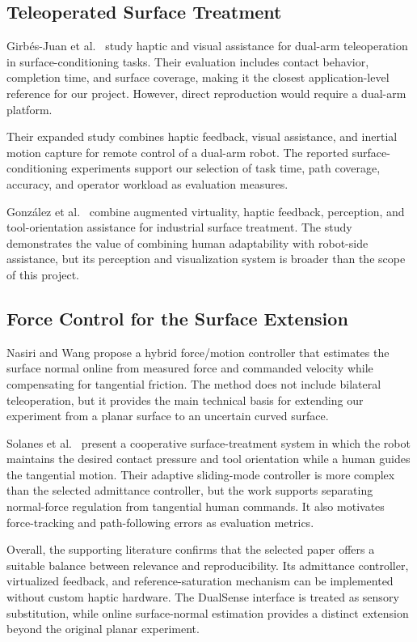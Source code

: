 \documentclass[journal]{IEEEtran}
\begin{document}
\subsection{Teleoperated Surface Treatment}
Girb\'es-Juan et al.\ \cite{girbes1} study haptic and visual assistance for dual-arm teleoperation in surface-conditioning tasks. Their evaluation includes contact behavior, completion time, and surface coverage, making it the closest application-level reference for our project. However, direct reproduction would require a dual-arm platform.

Their expanded study \cite{girbes2} combines haptic feedback, visual assistance, and inertial motion capture for remote control of a dual-arm robot. The reported surface-conditioning experiments support our selection of task time, path coverage, accuracy, and operator workload as evaluation measures.

Gonz\'alez et al.\ \cite{gonzalez} combine augmented virtuality, haptic feedback, perception, and tool-orientation assistance for industrial surface treatment. The study demonstrates the value of combining human adaptability with robot-side assistance, but its perception and visualization system is broader than the scope of this project.

\subsection{Force Control for the Surface Extension}
Nasiri and Wang \cite{nasiri} propose a hybrid force/motion controller that estimates the surface normal online from measured force and commanded velocity while compensating for tangential friction. The method does not include bilateral teleoperation, but it provides the main technical basis for extending our experiment from a planar surface to an uncertain curved surface.

Solanes et al.\ \cite{solanes} present a cooperative surface-treatment system in which the robot maintains the desired contact pressure and tool orientation while a human guides the tangential motion. Their adaptive sliding-mode controller is more complex than the selected admittance controller, but the work supports separating normal-force regulation from tangential human commands. It also motivates force-tracking and path-following errors as evaluation metrics.

Overall, the supporting literature confirms that the selected paper offers a suitable balance between relevance and reproducibility. Its admittance controller, virtualized feedback, and reference-saturation mechanism can be implemented without custom haptic hardware. The DualSense interface is treated as sensory substitution, while online surface-normal estimation provides a distinct extension beyond the original planar experiment.
\end{document}
